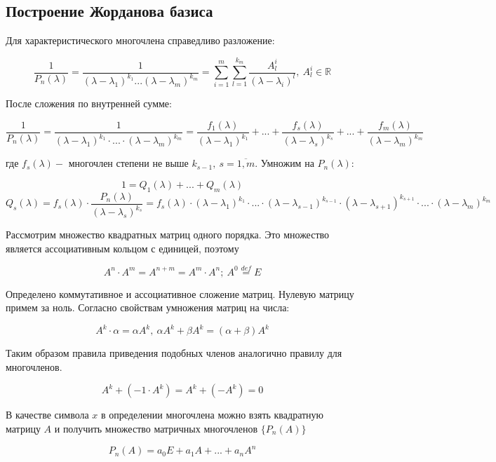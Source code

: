 \subsection{Построение Жорданова базиса}

Для характеристического многочлена справедливо разложение:

\[\frac{1}{P_n(\lambda)} = \frac{1}{(\lambda - \lambda_1)^{k_1}...(\lambda - \lambda_m)^{k_m}} = \sum\limits_{i = 1}^{m}{\sum\limits_{l=1}^{k_m}{\frac{A^i_l}{(\lambda - \lambda_i)^l}}},~ A^i_l \in \mathbb {R}\]

После сложения по внутренней сумме:

\[\frac{1}{P_n(\lambda)} = \frac{1}{(\lambda - \lambda_1)^{k_1} \cdot ...\cdot (\lambda - \lambda_m)^{k_m}} = \frac{f_1(\lambda)}{(\lambda-\lambda_1)^{k_1}} + ... + \frac{f_s(\lambda)}{(\lambda-\lambda_s)^{k_s}} + ... + \frac{f_m(\lambda)}{(\lambda-\lambda_m)^{k_m}}\]

где $f_s(\lambda) - $ многочлен степени не выше $k_{s-1},~ s = \overline{1, m}$. Умножим на $P_n(\lambda):$

\[1 = Q_1(\lambda) + ... + Q_m(\lambda)\]
\begin{equation}
	Q_s(\lambda) = f_s(\lambda)\cdot\frac{P_n(\lambda)}{(\lambda - \lambda_s)^{k_s}} = f_s(\lambda)\cdot(\lambda - \lambda_1)^{k_1} \cdot ... \cdot (\lambda - \lambda_{s-1})^{k_{s-1}} \cdot (\lambda - \lambda_{s+1})^{k_{s+1}} \cdot ... \cdot (\lambda - \lambda_{m})^{k_{m}}
	\label{20_1}
\end{equation}


Рассмотрим множество квадратных матриц одного порядка. Это множество является ассоциативным кольцом с единицей, поэтому

\[A^n \cdot A^m = A^{n+m} = A^m \cdot A^n;~ A^0 \stackrel{def}{=} E\]

Определено коммутативное и ассоциативное сложение матриц. Нулевую матрицу примем за ноль. Согласно свойствам умножения матриц на числа:

\[A^k \cdot \alpha = \alpha A^k,~ \alpha A^k + \beta A^k = (\alpha + \beta) A^k\]

Таким образом правила приведения подобных членов аналогично правилу для многочленов.

\[A^k + (-1 \cdot A^k) = A^k + (-A^k) = 0\]

В качестве символа $x$ в определении многочлена можно взять квадратную матрицу $A$ и получить множество матричных многочленов $\{P_n(A)\}$

\[P_n(A) = a_0 E + a_1 A + ... + a_n A^n\]

